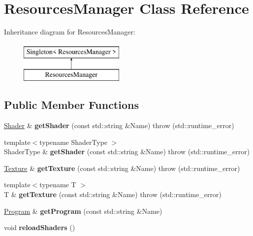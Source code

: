 \hypertarget{class_resources_manager}{\section{Resources\+Manager Class Reference}
\label{class_resources_manager}
}
Inheritance diagram for Resources\+Manager\+:\begin{figure}[H]
\begin{center}
\leavevmode
\includegraphics[height=2.000000cm]{class_resources_manager}
\end{center}
\end{figure}
\subsection*{Public Member Functions}
\begin{DoxyCompactItemize}
\item 
\hypertarget{class_resources_manager_abe9a41b9135bf25372c9b31d75c812ee}{\hyperlink{class_shader}{Shader} \& {\bfseries get\+Shader} (const std\+::string \&Name)  throw (std\+::runtime\+\_\+error)}\label{class_resources_manager_abe9a41b9135bf25372c9b31d75c812ee}

\item 
\hypertarget{class_resources_manager_a3e58aed8f31ea5597563535bd26ece09}{{\footnotesize template$<$typename Shader\+Type $>$ }\\Shader\+Type \& {\bfseries get\+Shader} (const std\+::string \&Name)  throw (std\+::runtime\+\_\+error)}\label{class_resources_manager_a3e58aed8f31ea5597563535bd26ece09}

\item 
\hypertarget{class_resources_manager_a2c01ee603157114a93fbfcbbab5e0b0d}{\hyperlink{class_texture}{Texture} \& {\bfseries get\+Texture} (const std\+::string \&Name)  throw (std\+::runtime\+\_\+error)}\label{class_resources_manager_a2c01ee603157114a93fbfcbbab5e0b0d}

\item 
\hypertarget{class_resources_manager_a19915262869d5bcc04fc388c50a7463d}{{\footnotesize template$<$typename T $>$ }\\T \& {\bfseries get\+Texture} (const std\+::string \&Name)  throw (std\+::runtime\+\_\+error)}\label{class_resources_manager_a19915262869d5bcc04fc388c50a7463d}

\item 
\hypertarget{class_resources_manager_a9431bf5993c25da60403f370f77b4317}{\hyperlink{class_program}{Program} \& {\bfseries get\+Program} (const std\+::string \&Name)}\label{class_resources_manager_a9431bf5993c25da60403f370f77b4317}

\item 
\hypertarget{class_resources_manager_a121aa0d53b343fe90e136dc7088ee634}{void {\bfseries reload\+Shaders} ()}\label{class_resources_manager_a121aa0d53b343fe90e136dc7088ee634}

\end{DoxyCompactItemize}
